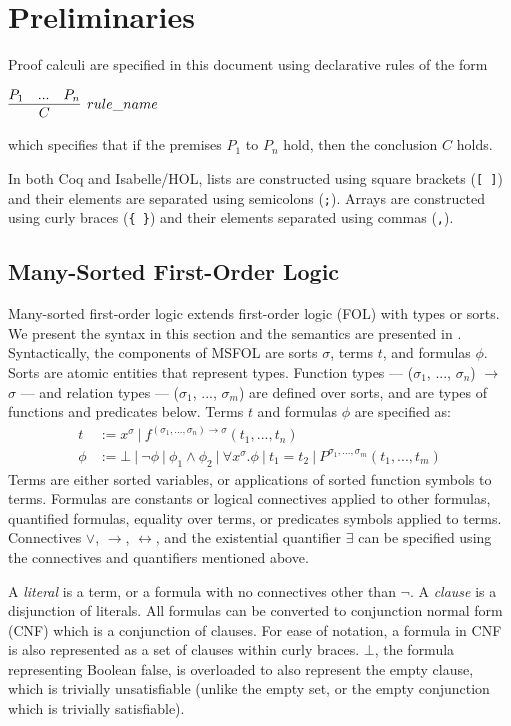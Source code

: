 \documentclass{article}
\begin{document}
	\section{Preliminaries}
	\label{sec:prelims}
	Proof calculi are specified in this 
	document using declarative rules of 
	the form
	\begin{center}
		$\infer[rule\_name]{C}{P_1 & ... & P_n}$
	\end{center}
	which specifies that if the premises $P_1$ to 
	$P_n$ hold, then the conclusion $C$
	holds.
	
	In both Coq and Isabelle/HOL,
	lists are constructed using 
	square brackets (\texttt{[ ]})
	and their elements are separated 
	using semicolons (\texttt{;}). 
	Arrays are constructed using 
	curly braces (\texttt{\{ \}})
	and their elements separated 
	using commas (\texttt{,}).
	
	\subsection{Many-Sorted First-Order Logic}
	\label{sec:msfol}
	Many-sorted first-order logic extends
	first-order logic (FOL) with 
	types or sorts. We present the 
	syntax in this section and the 
	semantics are presented in
	\cite{Barrett2018}. Syntactically, 
	the components of MSFOL are sorts 
	$\sigma$, terms $t$, and 
	formulas $\phi$. Sorts are 
	atomic entities that 
	represent types. Function types 
	--- ($\sigma_1$, ..., $\sigma_n$) 
	$\to$ $\sigma$ ---
	and relation types 
	--- ($\sigma_1$, ..., $\sigma_m$)
	are defined over sorts, and 
	are types of functions and 
	predicates below. Terms $t$ and 
	formulas $\phi$ are specified as:
	\begin{align*}
	t &:= x^{\sigma}\ |\ 
	f^{(\sigma_1, ..., \sigma_n) \to 
		\sigma}	(t_1, ..., t_n)\\
	\phi &:= \bot\ |\ \neg \phi\ |\ 
	\phi_1 \land \phi_2\ |\ \forall 
	x^{\sigma} . \phi\ |\ t_1 = t_2
	\ |\ P^{\sigma_1,...,\sigma_m}
	(t_1, ..., t_m)
	\end{align*}
	Terms are either sorted variables, 
	or applications of sorted function
	symbols to terms.
	Formulas are constants or logical 
	connectives applied to other 
	formulas, quantified formulas, 
	equality over terms, or predicates
	symbols applied to terms. Connectives 
	$\lor$, 
	$\to$, $\leftrightarrow$, and the 
	existential	quantifier $\exists$ 
	can be specified using the connectives 
	and quantifiers mentioned above.
	
	A \textit{literal} is a term, or a 
	formula with no connectives other than 
	$\neg$. A \textit{clause} is a 
	disjunction of literals. All formulas 
	can be converted to conjunction normal 
	form (CNF) which is a conjunction of 
	clauses. For ease of notation, 
	a formula in CNF is also represented
	as a set of clauses within curly 
	braces. $\bot$, the formula 
	representing Boolean false, 
	is overloaded to also represent
	the empty clause, which is trivially
	unsatisfiable (unlike the empty set,
	or the empty conjunction which is 
	trivially satisfiable).
	
\end{document}
